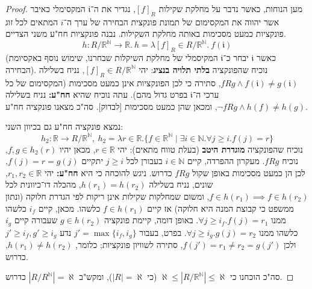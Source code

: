 \documentclass[]{article}
\newcommand\N     {\mathbb{N}}
\newcommand\R     {\mathbb{R}}
\newcommand\al    {\aleph}
\begin{document}
\begin{enumerate}[(a)]
\begin{proof}
			מען הנוחות, כאשר נדבר על מחלקת שקילות $ [f]_R $, נגדיר את ה־$ \mathfrak{i} $ המקסימלי כאיבר אשר יהווה את המקסימום של תמונת פונקצית הבחירה של ערך ה־$ i $ המתאים לכל זוג פונקציות כמעט מסכימות באותה מחלקת השקילות. נבנה פונקציות חח"ע משני הצדיים. 
			\[ h \colon R / \R^\N \to \R. \ h = \lambda [f]_R \in R / \R^\N. \ f(\mathfrak{i}) \]
			(כאשר $ \mathfrak{i} $ יבחר כ־$ \mathfrak{i} $ המקיסמלי של מחלקת השיקלות שבחרנו, שימוש נוסף באקסיומת הבחירה). נוכיח שהפונקציה \textbf{בלתי תלויה בנציג}: יהי $ [f]_R \in R / \R^\N $, נניח בשלילה $ fRg \land f(\mathfrak{i}) \neq g(\mathfrak{i}) $, סתירה כי לכן הפונקציות אינן כמעט מסכימות (המקסימום של כל ערכי ה־$ \mathfrak{i} $ בפרט גדול מהם). עתה נוכיח שהיא \textbf{חח"ע: }נניח בשלילה $ \lnot fRg \land h(f) \neq h(g) $, ומכאן שהן כמעט מסכימות [לבדוק]. סה"כ מצאנו פונקציה חח"ע. 
			
			נמצא פונקציה חח"ע גם בכיוון השני: 
			\[ h_2 \colon \R \to R / \R^\N, \ h_2 = \lambda r \in \R. \{f \in \R^\N \mid \exists i \in \N. \forall j \ge i. f(j) = r \} \]
			נוכיח שהפונקציה \textbf{מוגדרת היטב} (בעלת טווח מתאים): יהי $ r \in \R $, מכאן יהיו $ f, g \in h_2(r) $, נוכיח $ fRg $. מעקרון ההפרדה, קיים $ i \in \N $ בעבורן לכל $ j \ge i $ יתקיים $ f(j) = r = g(j) $, לכן הן כמעט מסכימות באופן שקול $ fRg $ כדרוש. ניגש להוכחה כי היא \textbf{חח"ע: }יהי $ r_1, r_2 \in \R $, שונים, נניח בשלילה $ h(r_1) = h(r_2) $, מהכלה דו־כיוונית לכל $ f \in h(r_1) \implies f \in h(r_2) $, ומשום שמחלקות שקילות אינן ריקות לפי הגדרת חלוקה (ונתון ממשפט כי קבוצת המנה היא חלוקה) אז קיים $ f \in h(r_1) $ כלשהו. מכאן, קיים $ i_f $ כלשהו ממנו $ \forall j \ge i_f. f(j)= r_1 $. באופן דומה, קיימת פונקציה $ g \in h(r_2) $ שעבורה קיים $ i_g $ כלשהו ממנו $ \forall j \ge i_g. g(j) = r_2 $. בפרט, בעבור $ j' = \max\{i_f, i_g\} $ נדע $ j' \ge i_f, g' \ge i_g $ ולכן $ f(j') = r_1 \neq r_2 = g(j') $, סתירה לשוויון פונקציות; כלומר, $ h(r_1) \neq h(r_2) $, כדרוש. 
			
			סה"כ הוכחנו כי $ \al \le |R / \R^\N| \le \al $ (כי $ |R| = \al $), ומקש"ב $ |R/R^\N| = \al $ כדרוש. 
		\end{proof}
	\end{enumerate}
\end{document}
